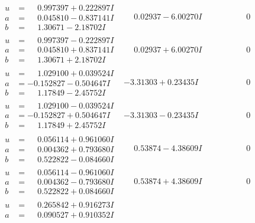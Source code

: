 \documentclass[1p]{elsarticle_modified}
\theoremstyle{definition}
\begin{document}
$$\begin{array}{c|c|c}
\begin{aligned}
u &= \phantom{-}0.997397 + 0.222897 I \\
a &= \phantom{-}0.045810 - 0.837141 I \\
b &= \phantom{-}1.30671 - 2.18702 I\end{aligned}
 & \phantom{-}0.02937 - 6.00270 I & \phantom{-0.000000 } 0 \\ \hline\begin{aligned}
u &= \phantom{-}0.997397 - 0.222897 I \\
a &= \phantom{-}0.045810 + 0.837141 I \\
b &= \phantom{-}1.30671 + 2.18702 I\end{aligned}
 & \phantom{-}0.02937 + 6.00270 I & \phantom{-0.000000 } 0 \\ \hline\begin{aligned}
u &= \phantom{-}1.029100 + 0.039524 I \\
a &= -0.152827 - 0.504647 I \\
b &= \phantom{-}1.17849 - 2.45752 I\end{aligned}
 & -3.31303 + 0.23435 I & \phantom{-0.000000 } 0 \\ \hline\begin{aligned}
u &= \phantom{-}1.029100 - 0.039524 I \\
a &= -0.152827 + 0.504647 I \\
b &= \phantom{-}1.17849 + 2.45752 I\end{aligned}
 & -3.31303 - 0.23435 I & \phantom{-0.000000 } 0 \\ \hline\begin{aligned}
u &= \phantom{-}0.056114 + 0.961060 I \\
a &= \phantom{-}0.004362 + 0.793680 I \\
b &= \phantom{-}0.522822 - 0.084660 I\end{aligned}
 & \phantom{-}0.53874 - 4.38609 I & \phantom{-0.000000 } 0 \\ \hline\begin{aligned}
u &= \phantom{-}0.056114 - 0.961060 I \\
a &= \phantom{-}0.004362 - 0.793680 I \\
b &= \phantom{-}0.522822 + 0.084660 I\end{aligned}
 & \phantom{-}0.53874 + 4.38609 I & \phantom{-0.000000 } 0 \\ \hline\begin{aligned}
u &= \phantom{-}0.265842 + 0.916273 I \\
a &= \phantom{-}0.090527 + 0.910352 I \\

\end{aligned}
\end{array}$$
\end{document}
